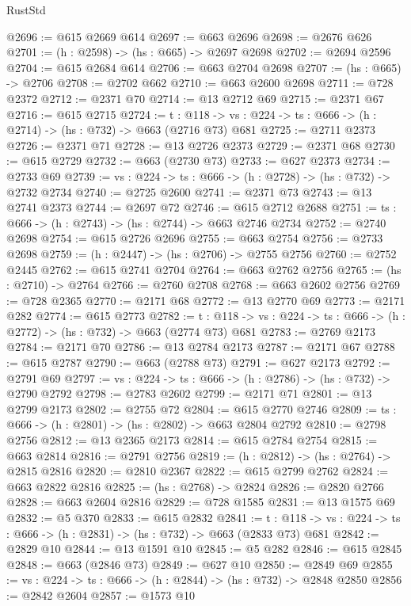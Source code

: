 \begin{lexlean}{RustStd}
\begin{coremodule}
{\begin{coremodule}
{{{{{{{@2696 := @615 @2669 @614
@2697 := @663 @2696
@2698 := @2676 @626
@2701 := (h : @2598) -> (hs : @665) -> @2697 @2698
@2702 := @2694 @2596
@2704 := @615 @2684 @614
@2706 := @663 @2704 @2698
@2707 := (hs : @665) -> @2706
@2708 := @2702 @662
@2710 := @663 @2600 @2698
@2711 := @728 @2372
@2712 := @2371 @70
@2714 := @13 @2712 @69
@2715 := @2371 @67
@2716 := @615 @2715
@2724 := {t : @118} ->
  {vs : @224} -> {ts : @666} -> (h : @2714) -> (hs : @732) -> @663 (@2716 @73) @681
@2725 := @2711 @2373
@2726 := @2371 @71
@2728 := @13 @2726 @2373
@2729 := @2371 @68
@2730 := @615 @2729
@2732 := @663 (@2730 @73)
@2733 := @627 @2373
@2734 := @2733 @69
@2739 := {vs : @224} -> {ts : @666} -> (h : @2728) -> (hs : @732) -> @2732 @2734
@2740 := @2725 @2600
@2741 := @2371 @73
@2743 := @13 @2741 @2373
@2744 := @2697 @72
@2746 := @615 @2712 @2688
@2751 := {ts : @666} -> (h : @2743) -> (hs : @2744) -> @663 @2746 @2734
@2752 := @2740 @2698
@2754 := @615 @2726 @2696
@2755 := @663 @2754
@2756 := @2733 @2698
@2759 := (h : @2447) -> (hs : @2706) -> @2755 @2756
@2760 := @2752 @2445
@2762 := @615 @2741 @2704
@2764 := @663 @2762 @2756
@2765 := (hs : @2710) -> @2764
@2766 := @2760 @2708
@2768 := @663 @2602 @2756
@2769 := @728 @2365
@2770 := @2171 @68
@2772 := @13 @2770 @69
@2773 := @2171 @282
@2774 := @615 @2773
@2782 := {t : @118} ->
  {vs : @224} -> {ts : @666} -> (h : @2772) -> (hs : @732) -> @663 (@2774 @73) @681
@2783 := @2769 @2173
@2784 := @2171 @70
@2786 := @13 @2784 @2173
@2787 := @2171 @67
@2788 := @615 @2787
@2790 := @663 (@2788 @73)
@2791 := @627 @2173
@2792 := @2791 @69
@2797 := {vs : @224} -> {ts : @666} -> (h : @2786) -> (hs : @732) -> @2790 @2792
@2798 := @2783 @2602
@2799 := @2171 @71
@2801 := @13 @2799 @2173
@2802 := @2755 @72
@2804 := @615 @2770 @2746
@2809 := {ts : @666} -> (h : @2801) -> (hs : @2802) -> @663 @2804 @2792
@2810 := @2798 @2756
@2812 := @13 @2365 @2173
@2814 := @615 @2784 @2754
@2815 := @663 @2814
@2816 := @2791 @2756
@2819 := (h : @2812) -> (hs : @2764) -> @2815 @2816
@2820 := @2810 @2367
@2822 := @615 @2799 @2762
@2824 := @663 @2822 @2816
@2825 := (hs : @2768) -> @2824
@2826 := @2820 @2766
@2828 := @663 @2604 @2816
@2829 := @728 @1585
@2831 := @13 @1575 @69
@2832 := @5 @370
@2833 := @615 @2832
@2841 := {t : @118} ->
  {vs : @224} -> {ts : @666} -> (h : @2831) -> (hs : @732) -> @663 (@2833 @73) @681
@2842 := @2829 @10
@2844 := @13 @1591 @10
@2845 := @5 @282
@2846 := @615 @2845
@2848 := @663 (@2846 @73)
@2849 := @627 @10
@2850 := @2849 @69
@2855 := {vs : @224} -> {ts : @666} -> (h : @2844) -> (hs : @732) -> @2848 @2850
@2856 := @2842 @2604
@2857 := @1573 @10
}}}}}}}
\end{coremodule}}
\end{coremodule}
\end{lexlean}
